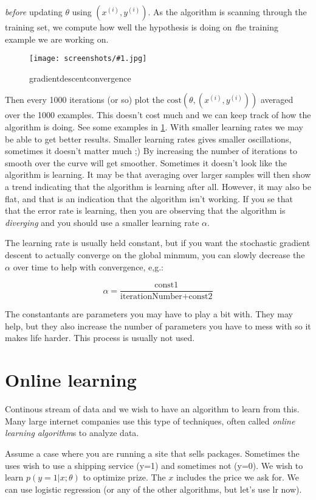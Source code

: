 \documentclass[a4, 12pt, english, USenglish]{scrreprt}
\newcommand{\screenshot}[2]{
\begin{figure}[htb]
\texttt{[image: screenshots/\#1.jpg]}
\label{#1}
\caption{#2}
\end{figure}}
\newcommand{\parens}[1]{\ensuremath{\left({#1}\right)}}
\newcommand{\idx}[1]{{\em #1}\index{#1}}
\begin{document}
{\em before} updating \(\theta\) using \(\parens{x^{(i)}, y^{(i)}}\).
As the algorithm is scanning through the training set, we compute how
well the hypothesis is doing on {\idx the training example we are
  working on}.

\screenshot{gradientdescentconvergence}{gradientdescentconvergence}

Then every  1000 iterations (or so) plot the \(\mbox{cost} (\theta,
(x^{(i)}, y^{(i)}))\) averaged over the 1000 examples.   This doesn't
cost much and we can keep track of how the algorithm is doing.  See
some examples in \ref{gradientdescentconvergence}.  With smaller
learning rates we may be able to get better results. Smaller learning
rates gives smaller oscillations, sometimes it doesn't matter much ;)
By increasing the number of iterations to smooth over the curve will
get smoother.  Sometimes it doesn't look like the algorithm is
learning.  It may be that averaging over larger samples will then show
a trend indicating that the algorithm is learning after all.  However,
it may also be flat, and that is an indication that the algorithm
isn't working.   If you se that that the error rate is learning, then
you are observing that the algorithm is \idx{diverging} and you should
use a smaller learning rate \(\alpha\).

The learning rate is usually held constant, but if you want the
stochastic gradient descent to actually converge on the global minmum,
you can slowly decrease the \(\alpha\) over time to help with
convergence, e,g.:

\[
      \alpha = \frac{\mbox{const1}}{\mbox{iterationNumber} + \mbox{const2}}
\]

The constantants are parameters you may have to play a bit with. They
may help, but they also increase the number of parameters you have to
mess with so it makes life harder.  This process is usually not used.

\section{Online learning}

Continous stream of data and we wish to have an algorithm to learn
from this.  Many large internet companies use this type of techniques,
often called \idx{online learning algorithm}s to analyze data.

Assume a case where you are running a site that sells packages.
Sometimes the uses wish to use a shipping service (y=1) and sometimes
not (y=0).   We wish to learn \(p(y=1 | x; \theta)\) to optimize
prize.  The \(x\) includes the price we ask for.  We can use logistic
regression (or any of the other algorithms, but let's use lr now).   
\end{document}
